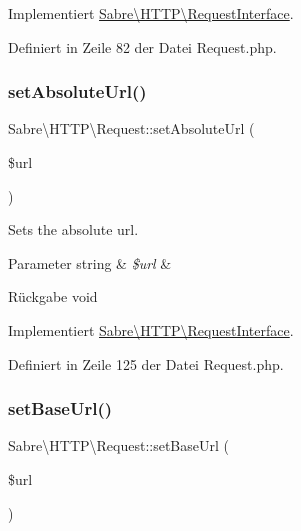 Implementiert \mbox{\hyperlink{interface_sabre_1_1_h_t_t_p_1_1_request_interface_a0b28a29e4efe43665cc2f23fbac62570}{Sabre\textbackslash{}\+H\+T\+T\+P\textbackslash{}\+Request\+Interface}}.



Definiert in Zeile 82 der Datei Request.\+php.

\mbox{\label{class_sabre_1_1_h_t_t_p_1_1_request_a4dd2d55f5c3a458c113bbb499a92c6ae}} 
\subsubsection{\texorpdfstring{set\+Absolute\+Url()}{setAbsoluteUrl()}}
{\footnotesize\ttfamily Sabre\textbackslash{}\+H\+T\+T\+P\textbackslash{}\+Request\+::set\+Absolute\+Url (\begin{DoxyParamCaption}\item[{}]{\$url }\end{DoxyParamCaption})}

Sets the absolute url.


\begin{DoxyParams}[1]{Parameter}
string & {\em \$url} & \\
\hline
\end{DoxyParams}
\begin{DoxyReturn}{Rückgabe}
void 
\end{DoxyReturn}


Implementiert \mbox{\hyperlink{interface_sabre_1_1_h_t_t_p_1_1_request_interface_a83a1eb456bef5552d0cbaae761f91ac1}{Sabre\textbackslash{}\+H\+T\+T\+P\textbackslash{}\+Request\+Interface}}.



Definiert in Zeile 125 der Datei Request.\+php.

\mbox{\label{class_sabre_1_1_h_t_t_p_1_1_request_afe2e7926b168b37dceec5b19668f1fb9}} 
\subsubsection{\texorpdfstring{set\+Base\+Url()}{setBaseUrl()}}
{\footnotesize\ttfamily Sabre\textbackslash{}\+H\+T\+T\+P\textbackslash{}\+Request\+::set\+Base\+Url (\begin{DoxyParamCaption}\item[{}]{\$url }\end{DoxyParamCaption})}


